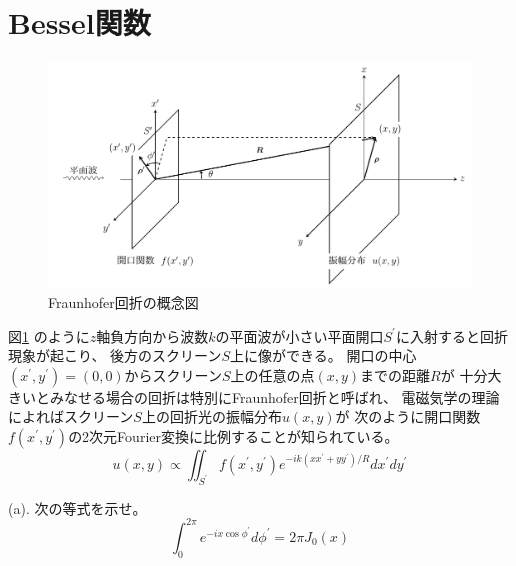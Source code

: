 \documentclass[../main/main]{subfiles}
\begin{document}
\section{Bessel関数}


\vspace{24pt}

\vspace{-12pt}
\begin{figure}[H]
  \centering
  \includegraphics[width=120mm]{../TikZ/diffraction/diffraction.pdf}
  \caption{Fraunhofer回折の概念図}
  \label{fig:diffraction}
\end{figure}

図\ref{fig:diffraction}
のように$z$軸負方向から波数$k$の平面波が小さい平面開口$S^\prime$に入射すると回折現象が起こり、
後方のスクリーン$S$上に像ができる。
開口の中心$(x^\prime, y^\prime) = (0, 0)$からスクリーン$S$上の任意の点$(x, y)$までの距離$R$が
十分大きいとみなせる場合の回折は特別にFraunhofer回折と呼ばれ、
電磁気学の理論によればスクリーン$S$上の回折光の振幅分布$u(x, y)$が
次のように開口関数$f(x^\prime, y^\prime)$の2次元Fourier変換に比例することが知られている。
\begin{equation}\label{eq:Q4-1u(x,y)}
  u(x, y) \propto \iint_{S^\prime} f(x^\prime, y^\prime) e^{-ik(xx^\prime + yy^\prime)/R} 
	dx^\prime dy^\prime
\end{equation}


\vspace{12pt}
(a). 次の等式を示せ。
\begin{equation}
  \int_0^{2\pi} e^{-ix\cos\phi^\prime} d\phi^\prime = 2\pi J_0(x)
\end{equation}
\end{document}
